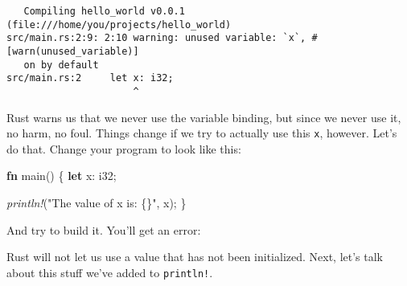 \documentclass[a4paper,]{book}
\newenvironment{Shaded}{\begin{snugshade}}{\end{snugshade}}
\newcommand{\KeywordTok}[1]{\textcolor[rgb]{0.13,0.29,0.53}{\textbf{{#1}}}}
\newcommand{\DataTypeTok}[1]{\textcolor[rgb]{0.13,0.29,0.53}{{#1}}}
\newcommand{\StringTok}[1]{\textcolor[rgb]{0.31,0.60,0.02}{{#1}}}
\newcommand{\PreprocessorTok}[1]{\textcolor[rgb]{0.56,0.35,0.01}{\textit{{#1}}}}
\newcommand{\NormalTok}[1]{{#1}}
\begin{document}
\begin{verbatim}
   Compiling hello_world v0.0.1 (file:///home/you/projects/hello_world)
src/main.rs:2:9: 2:10 warning: unused variable: `x`, #[warn(unused_variable)]
   on by default
src/main.rs:2     let x: i32;
                      ^
\end{verbatim}

Rust warns us that we never use the variable binding, but since we never
use it, no harm, no foul. Things change if we try to actually use this
\texttt{x}, however. Let's do that. Change your program to look like
this:

\begin{Shaded}
\begin{Highlighting}[]
\KeywordTok{fn} \NormalTok{main() \{}
    \KeywordTok{let} \NormalTok{x: }\DataTypeTok{i32}\NormalTok{;}

    \PreprocessorTok{println!}\NormalTok{(}\StringTok{"The value of x is: \{\}"}\NormalTok{, x);}
\NormalTok{\}}
\end{Highlighting}
\end{Shaded}

And try to build it. You'll get an error:

\begin{Shaded}
\end{Shaded}

Rust will not let us use a value that has not been initialized. Next,
let's talk about this stuff we've added to \texttt{println!}.
\end{document}
